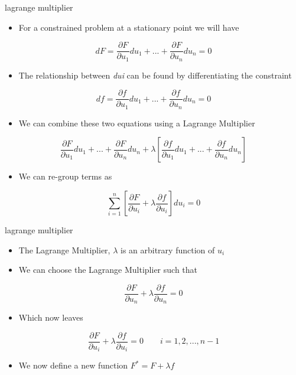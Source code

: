 \documentclass[12pt,handout]{beamer}
\providecommand{\tightlist}{%
  \setlength{\itemsep}{0pt}\setlength{\parskip}{0pt}}
\providecommand{\tightlist}{%
\setlength{\itemsep}{0pt}\setlength{\parskip}{0pt}}
\begin{document}
\begin{frame}{lagrange multiplier}
\protect\hypertarget{lagrange-multiplier}{}
\begin{itemize}
\tightlist
\item
  For a constrained problem at a stationary point we will have
\end{itemize}

\[dF = \frac{\partial F}{\partial u_1} du_1 + ... + \frac{\partial F}{\partial u_n} du_n = 0\]

\begin{itemize}
\tightlist
\item
  The relationship between \emph{du}\emph{i} can be found by
  differentiating the constraint
\end{itemize}

\[df = \frac{\partial f}{\partial u_1} du_1 + ... + \frac{\partial f}{\partial u_n} du_n = 0\]

\begin{itemize}
\tightlist
\item
  We can combine these two equations using a Lagrange Multiplier
\end{itemize}

\[\frac{\partial F}{\partial u_1} du_1 + ... + \frac{\partial F}{\partial u_n} du_n + \lambda \left[\frac{\partial f}{\partial u_1} du_1 + ... + \frac{\partial f}{\partial u_n} du_n \right]\]

\begin{itemize}
\tightlist
\item
  We can re-group terms as
\end{itemize}

\[\sum_{i=1}^n \left[\frac{\partial F}{\partial u_i} + \lambda \frac{\partial f}{\partial u_i} \right]du_i = 0\]
\end{frame}

\begin{frame}{lagrange multiplier}
\protect\hypertarget{lagrange-multiplier-1}{}
\begin{itemize}
\tightlist
\item
  The Lagrange Multiplier, \(\lambda\) is an arbitrary function of
  \(u_i\)
\item
  We can choose the Lagrange Multiplier such that
\end{itemize}

\[\frac{\partial F}{\partial u_n} + \lambda \frac{\partial f}{\partial u_n}  = 0\]

\begin{itemize}
\tightlist
\item
  Which now leaves
\end{itemize}

\[\frac{\partial F}{\partial u_i} + \lambda \frac{\partial f}{\partial u_i} = 0 \qquad i=1,2,...,n-1\]

\begin{itemize}
\tightlist
\item
  We now define a new function \(F^* = F + \lambda f\)
\end{itemize}
\end{frame}
\end{document}
